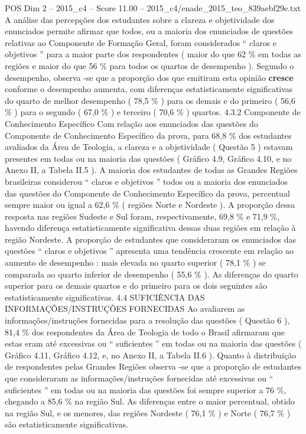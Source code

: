 \begin{textsample}{POS Dim 2 – 2015\_c4 – Score 11.00 – 2015\_c4/enade\_2015\_teo\_839aebf29e.txt}
A análise das percepções dos estudantes sobre a clareza e objetividade dos enunciados permite afirmar que todos, ou a maioria dos enunciados de questões relativas ao Componente de Formação Geral, foram considerados “ claros e objetivos ” para a maior parte dos respondentes ( maior do que 62 \% em todas as regiões e maior do que 56 \% para todos os quartos de desempenho ).
Segundo o desempenho, observa -se que a proporção dos que emitiram esta opinião \textbf{cresce} conforme o desempenho aumenta, com diferenças estatisticamente significativas do quarto de melhor desempenho ( 78,5 \% ) para os demais e do primeiro ( 56,6 \% ) para o segundo ( 67,0 \% ) e terceiro ( 70,6 \% ) quartos. 4.3.2 Componente de Conhecimento Específico Com relação aos enunciados das questões do Componente de Conhecimento Específico da prova, para 68,8 \% dos estudantes avaliados da Área de Teologia, a clareza e a objetividade ( Questão 5 ) estavam presentes em todas ou na maioria das questões ( Gráfico 4.9, Gráfico 4.10, e no Anexo II, a Tabela II.5 ).
A maioria dos estudantes de todas as Grandes Regiões brasileiras considerou “ claros e objetivos ” todos ou a maioria dos enunciados das questões do Componente de Conhecimento Específico da prova, percentual sempre maior ou igual a 62,6 \% ( regiões Norte e Nordeste ).
A proporção dessa resposta nas regiões Sudeste e Sul foram, respectivamente, 69,8 \% e 71,9 \%, havendo diferença estatisticamente significativa dessas duas regiões em relação à região Nordeste.
A proporção de estudantes que consideraram os enunciados das questões “ claros e objetivos ” apresenta uma tendência crescente em relação ao aumento de desempenho : mais elevada no quarto superior ( 78,1 \% ) se comparada ao quarto inferior de desempenho ( 55,6 \% ).
As diferenças do quarto superior para os demais quartos e do primeiro para os dois seguintes são estatisticamente significativas. 4.4 SUFICIÊNCIA DAS INFORMAÇÕES/INSTRUÇÕES FORNECIDAS Ao avaliarem as informações/instruções fornecidas para a resolução das questões ( Questão 6 ), 81,4 \% dos respondentes da Área de Teologia de todo o Brasil afirmaram que estas eram até excessivas ou “ suficientes ” em todas ou na maioria das questões ( Gráfico 4.11, Gráfico 4.12, e, no Anexo II, a Tabela II.6 ).
Quanto à distribuição de respondentes pelas Grandes Regiões observa -se que a proporção de estudantes que consideraram as informações/instruções fornecidas até excessivas ou “ suficientes ” em todas ou na maioria das questões foi sempre superior a 76 \%, chegando a 85,6 \% na região Sul.
As diferenças entre o maior percentual, obtido na região Sul, e os menores, das regiões Nordeste ( 76,1 \% ) e Norte ( 76,7 \% ) são estatisticamente significativas.

\end{textsample}
